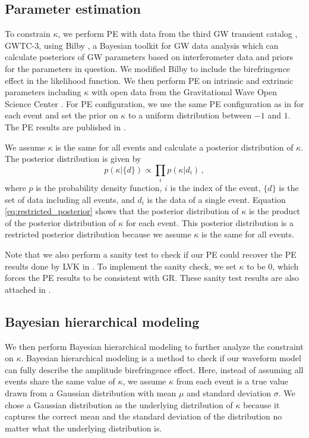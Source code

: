 \documentclass[aps,prd,twocolumn,superscriptaddress,preprintnumbers,floatfix,nofootinbib]{revtex4-2}
\begin{document}
\subsection{Parameter estimation}
To constrain $\kappa$, we perform PE with data from the third GW transient catalog \citep{GWTC-2.1, GWTC-3}, GWTC-3, using Bilby \citep{Bilby}, a Bayesian toolkit for GW data analysis which can calculate posteriors of GW parameters based on interferometer data and priors for the parameters in question.
We modified Bilby to include the birefringence effect in the likelihood function.
We then perform PE on intrinsic and extrinsic parameters including $\kappa$ with open data from the Gravitational Wave Open Science Center \citep{GWOSC}.
For PE configuration, we use the same PE configuration as in \citet{GWTC-2.1, GWTC-3} for each event and set the prior on $\kappa$ to a uniform distribution between $-1$ and $1$.
The PE results are published in \citet{dataset}.

We assume $\kappa$ is the same for all events and calculate a posterior distribution of $\kappa$.
The posterior distribution is given by
\begin{equation}
    p(\kappa|\{d\})\propto \prod_{i}p(\kappa|d_i)\,,
    \label{eq:restricted_posterior}
\end{equation}
where $p$ is the probability density function, $i$ is the index of the event, $\{d\}$ is the set of data including all events, and $d_i$ is the data of a single event.
Equation \ref{eq:restricted_posterior} shows that the posterior distribution of $\kappa$ is the product of the posterior distribution of $\kappa$ for each event.
This posterior distribution is a restricted posterior distribution because we assume $\kappa$ is the same for all events.

Note that we also perform a sanity test to check if our PE could recover the PE results done by LVK in \citet{GWTC-2.1, GWTC-3}.
To implement the sanity check, we set $\kappa$ to be $0$, which forces the PE results to be consistent with GR.
These sanity test results are also attached in \citet{dataset}.

\subsection{Bayesian hierarchical modeling}
We then perform Bayesian hierarchical modeling to further analyze the constraint on $\kappa$.
Bayesian hierarchical modeling is a method to check if our waveform model can fully describe the amplitude birefringence effect.
Here, instead of assuming all events share the same value of $\kappa$, we assume $\kappa$ from each event is a true value drawn from a Gaussian distribution with mean $\mu$ and standard deviation $\sigma$.
We chose a Gaussian distribution as the underlying distribution of $\kappa$ because it captures the correct mean and the standard deviation of the distribution no matter what the underlying distribution is.
\end{document}

